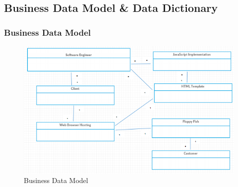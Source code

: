 \documentclass[11pt, oneside]{article}   	%
\begin{document}
\subsection{Business Data Model \& Data Dictionary}
\subsubsection{Business Data Model}
\begin{figure}[H] %
   \centering
   \includegraphics[width=6in]{BusinessDataModel.png} 
   \caption{Business Data Model}
   \label{fig:example}
\end{figure}
\end{document}
